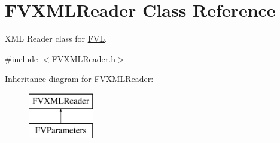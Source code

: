 \hypertarget{classFVL_1_1FVXMLReader}{
\section{FVXMLReader Class Reference}
\label{d2/d9a/classFVL_1_1FVXMLReader}
}


XML Reader class for \hyperlink{namespaceFVL}{FVL}.  




{\ttfamily \#include $<$FVXMLReader.h$>$}

Inheritance diagram for FVXMLReader:\begin{figure}[H]
\begin{center}
\leavevmode
\includegraphics[height=2.000000cm]{d2/d9a/classFVL_1_1FVXMLReader}
\end{center}
\end{figure}
